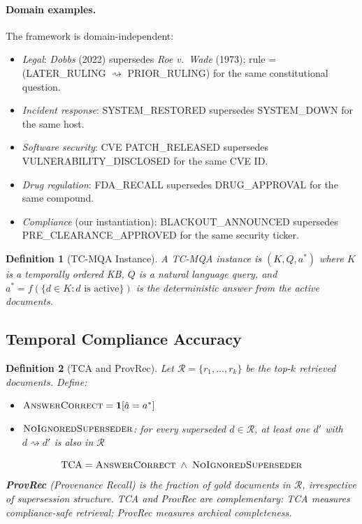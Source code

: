 \documentclass[11pt]{article}
\newtheorem{definition}{Definition}
\begin{document}
\paragraph{Domain examples.} The framework is domain-independent:
\begin{itemize}
  \item \textit{Legal}: \textit{Dobbs} (2022) supersedes \textit{Roe v.\ Wade} (1973); rule = (LATER\_RULING $\rightsquigarrow$ PRIOR\_RULING) for the same constitutional question.
  \item \textit{Incident response}: SYSTEM\_RESTORED supersedes SYSTEM\_DOWN for the same host.
  \item \textit{Software security}: CVE PATCH\_RELEASED supersedes VULNERABILITY\_DISCLOSED for the same CVE ID.
  \item \textit{Drug regulation}: FDA\_RECALL supersedes DRUG\_APPROVAL for the same compound.
  \item \textit{Compliance} (our instantiation): BLACKOUT\_ANNOUNCED supersedes PRE\_CLEARANCE\_APPROVED for the same security ticker.
\end{itemize}

\begin{definition}[TC-MQA Instance]
\label{def:tcmqa}
A \emph{TC-MQA instance} is $(K, Q, a^*)$ where $K$ is a temporally ordered KB, $Q$ is a natural language query, and $a^* = f(\{d \in K : d\text{ is active}\})$ is the deterministic answer from the active documents.
\end{definition}

\subsection{Temporal Compliance Accuracy}

\begin{definition}[TCA and ProvRec]
\label{def:tca}
Let $\mathcal{R} = \{r_1, \ldots, r_k\}$ be the top-$k$ retrieved documents. Define:
\begin{itemize}
  \item $\textsc{AnswerCorrect} = \mathbf{1}[\hat{a} = a^*]$
  \item $\textsc{NoIgnoredSuperseder}$: for every superseded $d \in \mathcal{R}$, at least one $d'$ with $d \rightsquigarrow d'$ is also in $\mathcal{R}$
\end{itemize}
\[
  \text{TCA} = \textsc{AnswerCorrect} \;\wedge\; \textsc{NoIgnoredSuperseder}
\]
\textbf{ProvRec} (Provenance Recall) is the fraction of gold documents in $\mathcal{R}$, irrespective of supersession structure. TCA and ProvRec are complementary: TCA measures compliance-safe retrieval; ProvRec measures archival completeness.
\end{definition}
\end{document}
